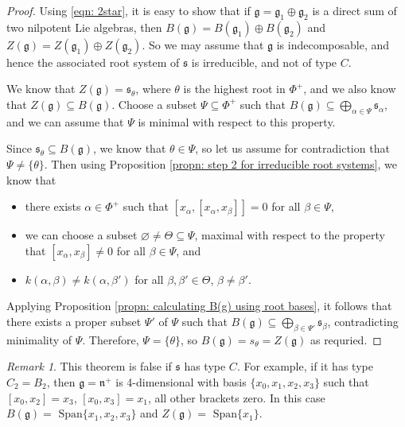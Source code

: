 \documentclass[12pt,a4paper]{article}
\theoremstyle{definition}
\theoremstyle{remark}
\newtheorem{rk}[thm]{Remark}
\theoremstyle{custthm}
\begin{document}
\begin{proof}

Using \eqref{eqn: 2star}, it is easy to show that if $\mathfrak{g}=\mathfrak{g}_1\oplus\mathfrak{g}_2$ is a direct sum of two nilpotent Lie algebras, then $B(\mathfrak{g})=B(\mathfrak{g}_1)\oplus B(\mathfrak{g}_2)$ and $Z(\mathfrak{g})=Z(\mathfrak{g}_1)\oplus Z(\mathfrak{g}_2)$. So we may assume that $\mathfrak{g}$ is indecomposable, and hence the associated root system of $\mathfrak{s}$ is irreducible, and not of type $C$.

We know that $Z(\mathfrak{g})=\mathfrak{s}_\theta$, where $\theta$ is the highest root in $\Phi^+$, and we also know that $Z(\mathfrak{g})\subseteq B(\mathfrak{g})$. Choose a subset $\Psi\subseteq \Phi^+$ such that $B(\mathfrak{g})\subseteq\underset{\alpha\in\Psi}{\bigoplus}\mathfrak{s}_{\alpha}$, and we can assume that $\Psi$ is minimal with respect to this property.

Since $\mathfrak{s}_\theta\subseteq B(\mathfrak{g})$, we know that $\theta\in\Psi$, so let us assume for contradiction that $\Psi\neq\{\theta\}$. Then using Proposition \ref{propn: step 2 for irreducible root systems}, we know that 

\begin{itemize}
\item there exists $\alpha\in\Phi^+$ such that $[x_\alpha,[x_\alpha,x_\beta]]=0$ for all $\beta\in\Psi$,

\item we can choose a subset $\varnothing\neq\Theta\subseteq\Psi$, maximal with respect to the property that $[x_\alpha,x_\beta]\neq 0$ for all $\beta\in\Psi$, and 

\item $k(\alpha,\beta)\neq k(\alpha,\beta')$ for all $\beta,\beta'\in\Theta$, $\beta\neq\beta'$. 
\end{itemize}

Applying Proposition \ref{propn: calculating B(g) using root bases}, it follows that there exists a proper subset $\Psi'$ of $\Psi$ such that $B(\mathfrak{g})\subseteq\underset{\beta\in\Psi'}{\bigoplus}\mathfrak{s}_\beta$, contradicting minimality of $\Psi$. Therefore, $\Psi=\{\theta\}$, so $B(\mathfrak{g})=s_{\theta}=Z(\mathfrak{g})$ as requried.\end{proof}

\begin{rk}
This theorem is false if $\mathfrak{s}$ has type $C$. For example, if it has type $C_2=B_2$, then $\mathfrak{g}=\mathfrak{n}^+$ is 4-dimensional with basis $\{x_0,x_1,x_2,x_3\}$ such that $[x_0,x_2]=x_3$, $[x_0,x_3]=x_1$, all other brackets zero. In this case $B(\mathfrak{g})=\text{ Span}\{x_1,x_2,x_3\}$ and $Z(\mathfrak{g})=\text{ Span}\{x_1\}$.
\end{rk}
\end{document}
